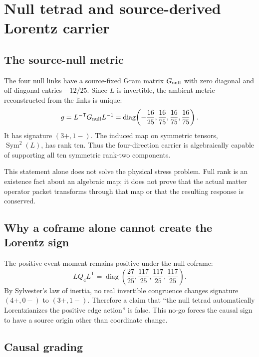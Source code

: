 \documentclass[11pt]{article}
\theoremstyle{definition}
\theoremstyle{remark}
\newcommand{\Sym}{\operatorname{Sym}}
\begin{document}
\section{Null tetrad and source-derived Lorentz carrier}

\subsection{The source-null metric}

The four null links have a source-fixed Gram matrix $G_{\rm null}$ with zero diagonal and off-diagonal entries $-12/25$. Since $L$ is invertible, the ambient metric reconstructed from the links is unique:
\begin{equation}\label{eq:g-null}
 g=L^{-\mathsf T}G_{\rm null}L^{-1}
 =\operatorname{diag}\!\left(
 -\frac{16}{25},\frac{16}{75},\frac{16}{75},\frac{16}{75}
 \right).
\end{equation}
It has signature $(3+,1-)$. The induced map on symmetric tensors, $\Sym^2(L)$, has rank ten. Thus the four-direction carrier is algebraically capable of supporting all ten symmetric rank-two components.

This statement alone does not solve the physical stress problem. Full rank is an existence fact about an algebraic map; it does not prove that the actual matter operator packet transforms through that map or that the resulting response is conserved.

\subsection{Why a coframe alone cannot create the Lorentz sign}

The positive event moment remains positive under the null coframe:
\begin{equation}
 LQ_4L^{\mathsf T}
 =\operatorname{diag}\!\left(
 \frac{27}{25},\frac{117}{25},\frac{117}{25},\frac{117}{25}
 \right).
\end{equation}
By Sylvester's law of inertia, no real invertible congruence changes signature $(4+,0-)$ to $(3+,1-)$. Therefore a claim that ``the null tetrad automatically Lorentzianizes the positive edge action'' is false. This no-go forces the causal sign to have a source origin other than coordinate change.

\subsection{Causal grading}
\end{document}
